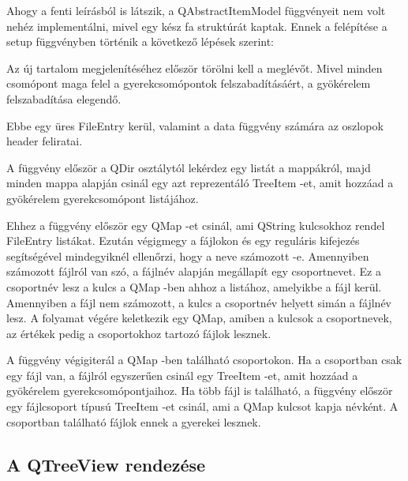 Ahogy a fenti leírásból is látszik, 
a {\ttfamily QAbstractItemModel} függvényeit nem volt nehéz implementálni, 
mivel egy kész fa struktúrát kaptak. 
Ennek a felépítése a {\ttfamily setup} függvényben történik 
a következő lépések szerint:
\begin{description}[font=\normalfont
\stepcounter{descriptcount}\arabic{descriptcount}.~]
\item [\textit{A meglévő gyökérelem törlése:}]
Az új tartalom megjelenítéséhez először törölni kell a meglévőt.
Mivel minden csomópont maga felel 
a gyerekcsomópontok felszabadításáért, 
a gyökérelem felszabadítása elegendő.
\item [\textit{Az új gyökérelem elkészítése:}]
Ebbe egy üres {\ttfamily FileEntry} kerül, 
valamint a {\ttfamily data} függvény számára 
az oszlopok header feliratai.
\item [{\itshape A mappákhoz tartozó csomópontok hozzáadása:}]
A függvény először a {\ttfamily QDir} osztálytól lekérdez 
egy listát a mappákról, 
majd minden mappa alapján csinál 
egy azt reprezentáló {\ttfamily TreeItem} -et, 
amit hozzáad a gyökérelem gyerekcsomópont listájához.
\item [\textit{Fájlcsoportok keresése:}]
Ehhez a függvény először egy {\ttfamily QMap} -et csinál, 
ami {\ttfamily QString} kulcsokhoz rendel {\ttfamily FileEntry} listákat. 
Ezután végigmegy a fájlokon és 
egy reguláris kifejezés segítségével mindegyiknél ellenőrzi, 
hogy a neve számozott -e. 
Amennyiben számozott fájlról van szó, 
a fájlnév alapján megállapít egy csoportnevet. 
Ez a csoportnév lesz a kulcs a {\ttfamily QMap} -ben ahhoz a listához, 
amelyikbe a fájl kerül. 
Amennyiben a fájl nem számozott, 
a kulcs a csoportnév helyett simán a fájlnév lesz. 
A folyamat végére keletkezik egy {\ttfamily QMap}, 
amiben a kulcsok a csoportnevek, 
az értékek pedig a csoportokhoz tartozó fájlok lesznek. 
\item [\textit{A fájlok és fájlcsoportok hozzáadása:}]
A függvény végigiterál a {\ttfamily QMap} -ben található csoportokon. 
Ha a csoportban csak egy fájl van, 
a fájlról egyszerűen csinál egy {\ttfamily TreeItem} -et, 
amit hozzáad a gyökérelem gyerekcsomópontjaihoz. 
Ha több fájl is található, 
a függvény először egy fájlcsoport típusú {\ttfamily TreeItem} -et csinál, 
ami a {\ttfamily QMap} kulcsot kapja névként. 
A csoportban található fájlok ennek a gyerekei lesznek. 
\end{description}

\subsection{A QTreeView rendezése}

